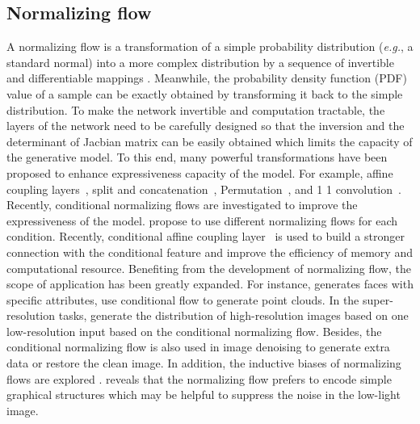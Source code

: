 \documentclass[letterpaper]{article} \usepackage{aaai22}  \usepackage{times}  \usepackage{helvet}  \usepackage{courier}  \usepackage[hyphens]{url}  \usepackage{graphicx} \urlstyle{rm} \def\UrlFont{\rm}  \usepackage{natbib}  \usepackage{caption} \usepackage{subfigure}
\def\eg{\emph{e.g.}}
\def\eg{{\emph{e.g.}}}
\begin{document}
\subsection{Normalizing flow}
A normalizing flow is a transformation of a simple probability distribution (\eg, a standard normal) into a more complex distribution by a sequence of invertible and differentiable mappings \cite{kobyzev2020normalizing}. Meanwhile, the probability density function (PDF) value of a sample can be exactly obtained by transforming it back to the simple distribution. To make the network invertible and computation tractable, the layers of the network need to be carefully designed so that the inversion and the determinant of Jacbian matrix can be easily obtained which limits the capacity of the generative model. To this end, many powerful transformations have been proposed to enhance expressiveness capacity of the model. For example, affine coupling layers~\cite{dinh2014nice}, split and concatenation~\cite{dinh2014nice, dinh2016density, kingma2018glow}, Permutation~\cite{dinh2014nice, dinh2016density, kingma2018glow}, and 1  1 convolution~\cite{kingma2018glow}. Recently, conditional normalizing flows are investigated to improve the expressiveness of the model. \cite{trippe2018conditional} propose to use different normalizing flows for each condition. Recently, conditional affine coupling layer~\cite{ardizzone2019guided,winkler2019learning,lugmayr2020srflow} is used to build a stronger connection with the conditional feature and improve the efficiency of memory and computational resource. Benefiting from the development of normalizing flow, the scope of application has been greatly expanded. For instance, \cite{liu2019conditional} generates faces with specific attributes, \cite{pumarola2020c, yang2019pointflow} use conditional flow to generate point clouds. In the super-resolution tasks, \cite{lugmayr2020srflow, winkler2019learning, wolf2021deflow} generate the distribution of high-resolution images based on one low-resolution input based on the conditional normalizing flow. Besides, the conditional normalizing flow is also used in image denoising \cite{abdelhamed2019noise,liu2021invertible} to generate extra data or restore the clean image.  
In addition, the inductive biases of normalizing flows are explored \cite{jaini2020tails, kirichenko2020normalizing}. \cite{kirichenko2020normalizing} reveals that the normalizing flow prefers to encode simple graphical structures which may be helpful to suppress the noise in the low-light image.
\end{document}
